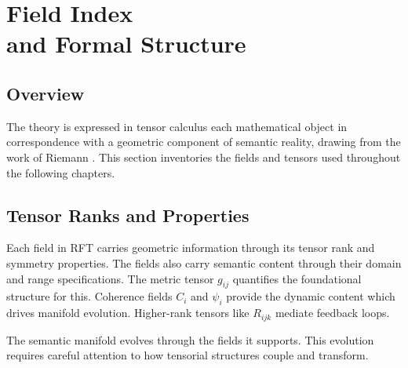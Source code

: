 \chapter{Field Index \\ and Formal Structure}

\section{Overview}

The theory is expressed in tensor calculus each mathematical object in correspondence with a geometric component of semantic reality, drawing from the work of Riemann \autocite{Riemann1868}. This section inventories the fields and tensors used throughout the following chapters.

\section{Tensor Ranks and Properties}

Each field in RFT carries geometric information through its tensor rank and symmetry properties. The fields also carry semantic content through their domain and range specifications. The metric tensor \(g_{ij}\) quantifies the foundational structure for this. Coherence fields \(C_i\) and \(\psi_i\) provide the dynamic content which drives manifold evolution. Higher-rank tensors like \(R_{ijk}\) mediate feedback loops.

The semantic manifold evolves through the fields it supports. This evolution requires careful attention to how tensorial structures couple and transform.

